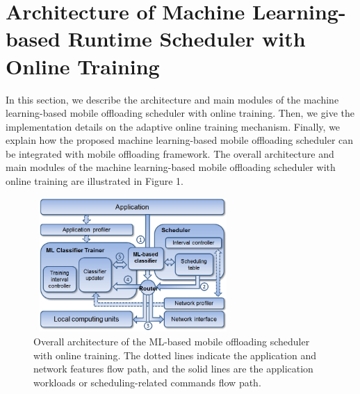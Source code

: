 \documentclass[10pt, conference, compsocconf]{IEEEtran}
\begin{document}
\section{Architecture of Machine Learning-based Runtime Scheduler with
Online Training}
%
In this section, we describe the architecture and main modules of the
machine learning-based mobile offloading scheduler with online training.
%
Then, we give the implementation details on the adaptive online training
mechanism.
%
Finally, we explain how the proposed machine learning-based mobile
offloading scheduler can be integrated with mobile offloading framework.
%
The overall architecture and main modules of the machine learning-based
mobile offloading scheduler with online training are illustrated in
Figure 1.
%
\begin{figure}
\centering
\includegraphics[height=5.1cm, width=7.6cm]{Figure/figure1}
\caption{Overall architecture of the ML-based mobile offloading
scheduler with online training. The dotted lines indicate the
application and network features flow path, and the solid lines are the
application workloads or scheduling-related commands flow path.}
\end{figure}
%
\end{document}
